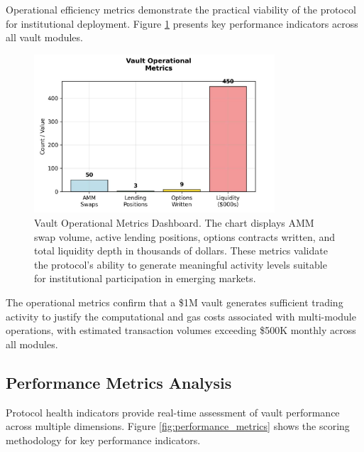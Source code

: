 \documentclass[12pt]{article}
\begin{document}
Operational efficiency metrics demonstrate the practical viability of the protocol for institutional deployment. Figure \ref{fig:operational_metrics} presents key performance indicators across all vault modules.

\begin{figure}[h]
    \centering
    \includegraphics[width=0.8\textwidth]{operational_metrics.jpg}
    \caption{Vault Operational Metrics Dashboard. The chart displays AMM swap volume, active lending positions, options contracts written, and total liquidity depth in thousands of dollars. These metrics validate the protocol's ability to generate meaningful activity levels suitable for institutional participation in emerging markets.}
    \label{fig:operational_metrics}
\end{figure}

The operational metrics confirm that a \$1M vault generates sufficient trading activity to justify the computational and gas costs associated with multi-module operations, with estimated transaction volumes exceeding \$500K monthly across all modules.

\subsection{Performance Metrics Analysis}

Protocol health indicators provide real-time assessment of vault performance across multiple dimensions. Figure \ref{fig:performance_metrics} shows the scoring methodology for key performance indicators.
\end{document}
